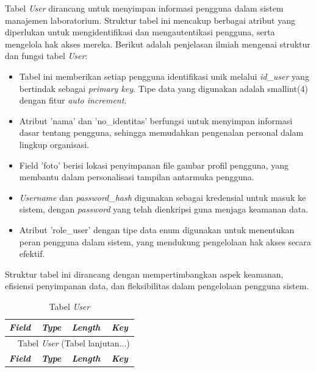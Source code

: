 \begin{enumerate}
	      Tabel \textit{User} dirancang untuk menyimpan informasi pengguna dalam sistem manajemen laboratorium. Struktur tabel ini mencakup berbagai atribut yang diperlukan untuk mengidentifikasi dan mengautentikasi pengguna, serta mengelola hak akses mereka. Berikut adalah penjelasan ilmiah mengenai struktur dan fungsi tabel \textit{User}:

	      \begin{itemize}
		      \item Tabel ini memberikan setiap pengguna identifikasi unik melalui \textit{id\_user} yang bertindak sebagai \textit{primary key}. Tipe data yang digunakan adalah smallint(4) dengan fitur \textit{auto increment}.
		      \item Atribut 'nama' dan 'no\_identitas' berfungsi untuk menyimpan informasi dasar tentang pengguna, sehingga memudahkan pengenalan personal dalam lingkup organisasi.
		      \item Field 'foto' berisi lokasi penyimpanan file gambar profil pengguna, yang membantu dalam personalisasi tampilan antarmuka pengguna.
		      \item \textit{Username} dan \textit{password\_hash} digunakan sebagai kredensial untuk masuk ke sistem, dengan \textit{password} yang telah dienkripsi guna menjaga keamanan data.
		      \item Atribut 'role\_user' dengan tipe data enum digunakan untuk menentukan peran pengguna dalam sistem, yang mendukung pengelolaan hak akses secara efektif.
	      \end{itemize}

	      Struktur tabel ini dirancang dengan mempertimbangkan aspek keamanan, efisiensi penyimpanan data, dan fleksibilitas dalam pengelolaan pengguna sistem.

		      {
			      \fontsize{10}{12}\selectfont
			      \begin{longtable}{l l l l}
				      \caption{Tabel \textit{User}}
				      \label{admin}                                                                                                                 \\
				      \hline
				      \textbf{\textit{Field}} & \textbf{\textit{Type}} & \textbf{\textit{Length}}                           & \textbf{\textit{Key}} \\
				      \hline
				      \endfirsthead

				      \multicolumn{4}{c}{\tablename\ \thetable\ {Tabel \textit{User}} \space (Tabel lanjutan...)}                                   \\
				      \hline
				      \textbf{\textit{Field}} & \textbf{\textit{Type}} & \textbf{\textit{Length}}                           & \textbf{\textit{Key}} \\
				      \hline
				      \endhead


\end{longtable}}
\end{enumerate}
